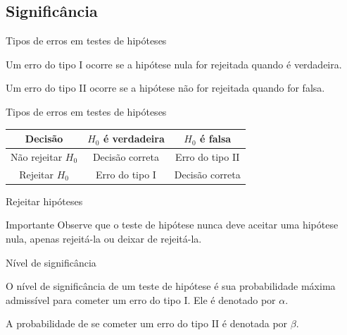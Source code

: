 \documentclass{beamer}
\begin{document}
\subsection{Significância}

\begin{frame}{Tipos de erros em testes de hipóteses}
  \begin{definition}
    Um \alert{erro do tipo I} ocorre se a hipótese nula for rejeitada
    quando é verdadeira.
  \end{definition}
  \begin{definition}
    Um \alert{erro do tipo II} ocorre se a hipótese não for rejeitada
    quando for falsa.
  \end{definition}
\end{frame}

\begin{frame}{Tipos de erros em testes de hipóteses}
  \begin{tabular}{c||c|c}
    Decisão & $H_0$ é verdadeira & $H_0$ é falsa \\
    \hline
    \hline
    Não rejeitar $H_0$ & Decisão correta & Erro do tipo II\\
    \hline
    Rejeitar $H_0$ & Erro do tipo I & Decisão correta\\
  \end{tabular}
\end{frame}

\begin{frame}{Rejeitar hipóteses}
  \begin{block}{Importante}
    Observe que o teste de hipótese nunca deve \alert{aceitar} uma
    hipótese nula, apenas rejeitá-la ou deixar de rejeitá-la.
  \end{block}
\end{frame}

\begin{frame}{Nível de significância}
  \begin{definition}
    O \alert{nível de significância} de um teste de hipótese é sua
    probabilidade máxima admissível para cometer um erro do tipo
    I. Ele é denotado por $\alpha$.
  \end{definition}
  \begin{definition}
    A probabilidade de se cometer um erro do tipo II é denotada por
    $\beta$.
  \end{definition}
\end{frame}
\end{document}
